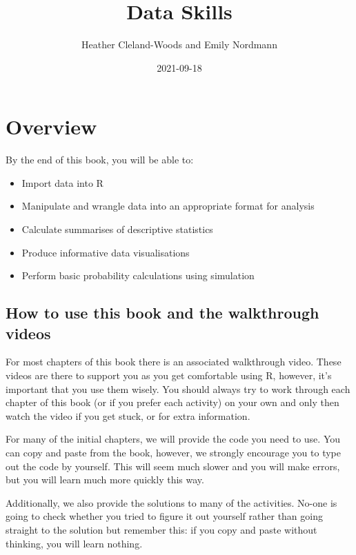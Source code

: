 \documentclass[
  oneside]{book}
\title{Data Skills}
\author{Heather Cleland-Woods and Emily Nordmann}
\date{2021-09-18}
\providecommand{\tightlist}{%
  \setlength{\itemsep}{0pt}\setlength{\parskip}{0pt}}
\begin{document}
\maketitle

{
\setcounter{tocdepth}{1}
\tableofcontents
}
\hypertarget{overview}{%
\chapter*{Overview}\label{overview}}

By the end of this book, you will be able to:

\begin{itemize}
\tightlist
\item
  Import data into R
\item
  Manipulate and wrangle data into an appropriate format for analysis
\item
  Calculate summarises of descriptive statistics
\item
  Produce informative data visualisations
\item
  Perform basic probability calculations using simulation
\end{itemize}

\hypertarget{how-to-use-this-book-and-the-walkthrough-videos}{%
\section{How to use this book and the walkthrough videos}\label{how-to-use-this-book-and-the-walkthrough-videos}}

For most chapters of this book there is an associated walkthrough video. These videos are there to support you as you get comfortable using R, however, it's important that you use them wisely. You should always try to work through each chapter of this book (or if you prefer each activity) on your own and only then watch the video if you get stuck, or for extra information.

For many of the initial chapters, we will provide the code you need to use. You can copy and paste from the book, however, we strongly encourage you to type out the code by yourself. This will seem much slower and you will make errors, but you will learn much more quickly this way.

Additionally, we also provide the solutions to many of the activities. No-one is going to check whether you tried to figure it out yourself rather than going straight to the solution but remember this: if you copy and paste without thinking, you will learn nothing.
\end{document}
